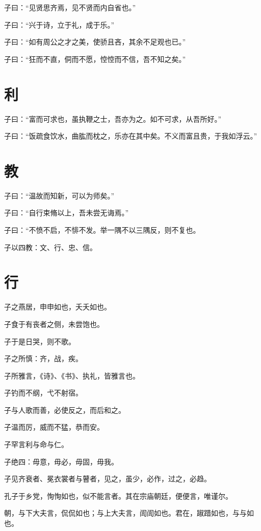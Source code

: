 \documentclass[a5paper]{ctexbook}
\begin{document}
    子曰：“见贤思齐焉，见不贤而内自省也。”

    子曰：“兴于诗，立于礼，成于乐。”

    子曰：“如有周公之才之美，使骄且吝，其余不足观也已。”

    子曰：“狂而不直，侗而不愿，悾悾而不信，吾不知之矣。”

    \chapter{利}

    子曰：“富而可求也，虽执鞭之士，吾亦为之。如不可求，从吾所好。”

    子曰：“饭疏食饮水，曲肱而枕之，乐亦在其中矣。不义而富且贵，于我如浮云。”

    \chapter{教}

    子曰：“温故而知新，可以为师矣。”

    子曰：“自行束脩以上，吾未尝无诲焉。”

    子曰：“不愤不启，不悱不发。举一隅不以三隅反，则不复也。

    子以四教：文、行、忠、信。

    \chapter{行}

    子之燕居，申申如也，夭夭如也。

    子食于有丧者之侧，未尝饱也。

    子于是日哭，则不歌。

    子之所慎：齐，战，疾。

    子所雅言，《诗》、《书》、执礼，皆雅言也。

    子钓而不纲，弋不射宿。

    子与人歌而善，必使反之，而后和之。

    子温而厉，威而不猛，恭而安。

    子罕言利与命与仁。

    子绝四：毋意，毋必，毋固，毋我。

    子见齐衰者、冕衣裳者与瞽者，见之，虽少，必作，过之，必趋。

    孔子于乡党，恂恂如也，似不能言者。其在宗庙朝廷，便便言，唯谨尔。

    朝，与下大夫言，侃侃如也；与上大夫言，訚訚如也。君在，踧踖如也，与与如也。
\end{document}
